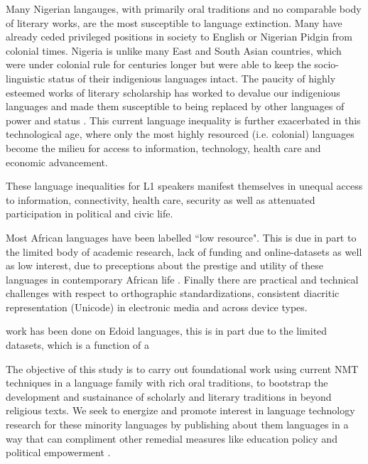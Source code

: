 \documentclass{article} %
\begin{document}

Many Nigerian langauges, with primarily oral traditions and no comparable body of literary works, are the most susceptible to language extinction. Many have already ceded privileged positions in society to English or Nigerian Pidgin from colonial times. Nigeria is unlike many East and South Asian countries, which were under colonial rule for centuries longer but were able to keep the socio-linguistic status of their indigenious languages intact. The paucity of highly esteemed works of literary scholarship has worked to devalue our indigenious languages and made them susceptible to being replaced by other languages of power and status \citep{awobuluyi201626}. This current language inequality is further exacerbated in this technological age, where only the most highly resourced (i.e. colonial) languages become the milieu for access to information, technology, health care and economic advancement. 

These language inequalities for L1 speakers manifest themselves in unequal access to information, connectivity, health care, security as well as attenuated participation in political and civic life.



Most African languages have been labelled ``low resource". This is due in part to the limited body of academic research, lack of funding and online-datasets as well as low interest, due to preceptions about the prestige and utility of these languages in contemporary African life \cite{odojelanguage, awobuluyi201626}. Finally there are practical and technical challenges with respect to orthographic standardizations, consistent diacritic representation (Unicode) in electronic media and across device types. 

work has been done on Edoid languages, this is in part due to the limited datasets, which is a function of a 

The objective of this study is to carry out foundational work using current NMT techniques in a language family with rich oral traditions, to bootstrap the development and sustainance of scholarly and literary traditions in beyond religious texts. We seek to energize and promote interest in language technology research for these minority languages by publishing about them languages in a way that can compliment other remedial measures like education policy and political empowerment \citep{awobuluyi201626}.
\end{document}
